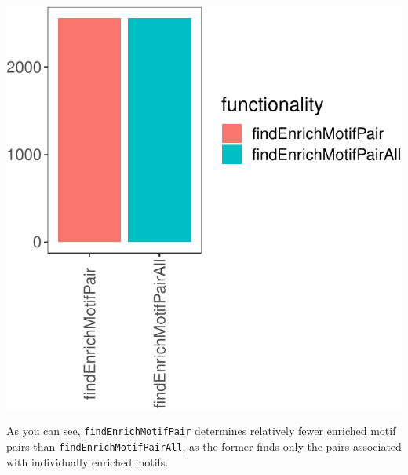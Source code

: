 \documentclass[
]{article}
\begin{document}
\includegraphics{enrichmotifpairR_user_manual_guide_files/figure-latex/Th1_vs_Th0_all_pairs_3_comparison_plot-1.pdf}

As you can see, \texttt{findEnrichMotifPair} determines relatively fewer
enriched motif pairs than \texttt{findEnrichMotifPairAll}, as the former
finds only the pairs associated with individually enriched motifs.
\end{document}
